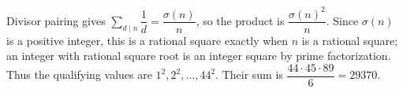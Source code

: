 Divisor pairing gives $\sum_{d\mid n}\dfrac{1}{d}=\dfrac{\sigma(n)}{n}$, so the product is $\dfrac{\sigma(n)^2}{n}$. Since $\sigma(n)$ is a positive integer, this is a rational square exactly when $n$ is a rational square; an integer with rational square root is an integer square by prime factorization. Thus the qualifying values are $1^2,2^2,\ldots,44^2$. Their sum is $\dfrac{44\cdot45\cdot89}{6}=\boxed{29370}$.
